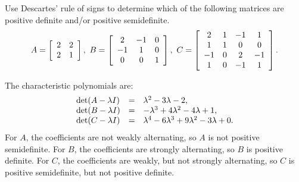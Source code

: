 \documentclass{ximera}
\begin{document}
\begin{exercise}
  Use Descartes' rule of signs to determine which of the following
  matrices are positive definite and/or positive semidefinite.
  \begin{equation*}
    A = \startmat{cc}
      2 & 2 \\
      2 & 1 \\
    \stopmat,
    \quad
    B = \startmat{ccc}
      2  & -1 & 0 \\
      -1 &  1 & 0 \\
      0  &  0 & 1 \\
    \stopmat,
    \quad
    C = \startmat{cccc}
      2  & 1 & -1 &  1 \\
      1  & 1 &  0 &  0 \\
      -1 & 0 &  2 & -1 \\
      1  & 0 & -1 &  1 \\
    \stopmat.
  \end{equation*}
  \begin{solution}
    The characteristic polynomials are:
    \begin{equation*}
      \begin{array}{lcl}
        \det(A-\eigenvar I) &=& \eigenvar^2 - 3\eigenvar - 2, \\
        \det(B-\eigenvar I) &=& -\eigenvar^3 + 4\eigenvar^2 - 4\eigenvar + 1, \\
        \det(C-\eigenvar I) &=& \eigenvar^4 - 6\eigenvar^3 + 9\eigenvar^2 - 3\eigenvar + 0.
      \end{array}
    \end{equation*}
    For $A$, the coefficients are not weakly alternating, so $A$ is
    not positive semidefinite. For $B$, the coefficients are strongly
    alternating, so $B$ is positive definite. For $C$, the
    coefficients are weakly, but not strongly alternating, so $C$ is
    positive semidefinite, but not positive definite.
  \end{solution}
\end{exercise}
\end{document}
